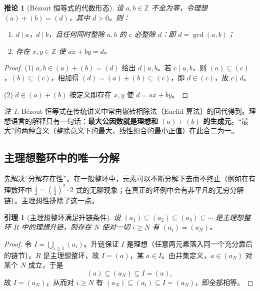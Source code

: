 \documentclass[a4paper,11pt]{ctexart}
\numberwithin{equation}{section}
\theoremstyle{plain}
\newtheorem{lemma}[theorem]{引理}
\newtheorem{corollary}[theorem]{推论}
\theoremstyle{definition}
\theoremstyle{remark}
\newtheorem{remark}[theorem]{注}
\newcommand{\Z}{\mathbb{Z}}
\begin{document}
\begin{corollary}[Bézout 恒等式的代数形态]\label{cor:bezout}
设 $a,b\in\Z$ 不全为零，令理想 $(a)+(b)=(d)$，其中 $d>0$。则：
\begin{enumerate}[itemsep=0.1em]
  \item $d\mid a$，$d\mid b$，且任何同时整除 $a,b$ 的 $c$ 必整除 $d$：即 $d=\gcd(a,b)$；
  \item 存在 $x,y\in\Z$ 使 $ax+by=d$。
\end{enumerate}
\end{corollary}

\begin{proof}
(1) $a,b\in(a)+(b)=(d)$ 给出 $d\mid a,b$。若 $c\mid a,b$，则 $(a)\subseteq(c)$，$(b)\subseteq(c)$，相加得 $(d)=(a)+(b)\subseteq(c)$，即 $d\in(c)$，故 $c\mid d$。

(2) $d\in(a)+(b)$ 按定义即存在 $x,y$ 使 $d=ax+by$。
\end{proof}

\begin{remark}
Bézout 恒等式在传统讲义中常由辗转相除法（Euclid 算法）的回代得到。理想语言的解释只有一句话：\textbf{最大公因数就是理想和 $(a)+(b)$ 的生成元}。“最大”的两种含义（整除意义下的最大、线性组合的最小正值）在此合二为一。
\end{remark}

\subsection{主理想整环中的唯一分解}

先解决“分解存在性”。在一般整环中，元素可以不断分解下去而不终止（例如在有理数环中 $\tfrac12=(\tfrac12)^2\cdot 2$ 式的无聊现象；在真正的坏例中会有非平凡的无穷分解链）。主理想性排除了这一点。

\begin{lemma}[主理想整环满足升链条件]\label{lem:ACC}
设 $(a_1)\subseteq (a_2)\subseteq (a_3)\subseteq\cdots$ 是主理想整环 $R$ 中的理想升链，则存在 $N$ 使对一切 $i\ge N$ 有 $(a_i)=(a_N)$。
\end{lemma}

\begin{proof}
令 $I=\bigcup_{i\ge1}(a_i)$。升链保证 $I$ 是理想（任意两元素落入同一个充分靠后的链节）。$R$ 是主理想整环，故 $I=(a)$，某 $a\in I$。由并集定义，$a\in (a_N)$ 对某个 $N$ 成立，于是
\[
(a)\subseteq (a_N)\subseteq I=(a),
\]
故 $I=(a_N)$，从而对 $i\ge N$ 有 $(a_N)\subseteq (a_i)\subseteq I=(a_N)$，即全部相等。
\end{proof}
\end{document}
